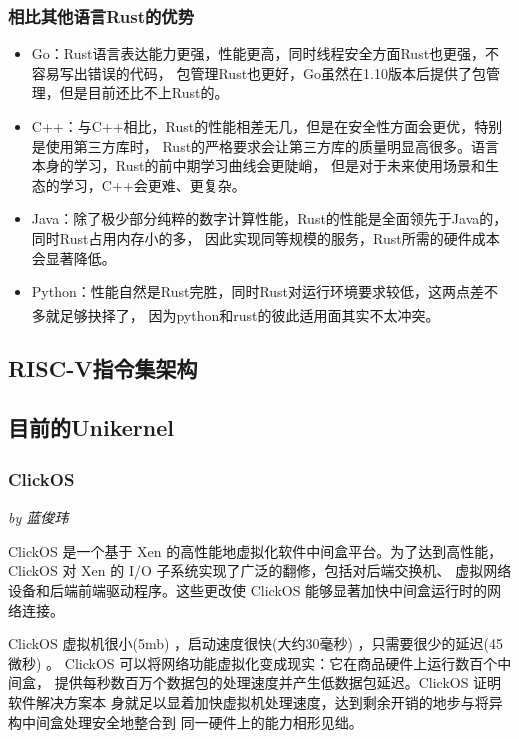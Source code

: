 \documentclass[UTF8,fontset=none,linespread=1.15]{ctexart}
\let\nosupcite\cite
\renewcommand*{\cite}[1]{\textsuperscript{\nosupcite{#1}}}
\newcommand{\sectionauthor}[1]{%
\vspace*{-5ex}
\noindent\textrm{\hfill\textit{by #1}}
\vspace*{3ex}\par}
\begin{document}
\subsubsection{相比其他语言Rust的优势}

\begin{itemize}
\item Go：Rust语言表达能力更强，性能更高，同时线程安全方面Rust也更强，不容易写出错误的代码，
包管理Rust也更好，Go虽然在1.10版本后提供了包管理，但是目前还比不上Rust的。
\item C++：与C++相比，Rust的性能相差无几，但是在安全性方面会更优，特别是使用第三方库时，
Rust的严格要求会让第三方库的质量明显高很多。语言本身的学习，Rust的前中期学习曲线会更陡峭，
但是对于未来使用场景和生态的学习，C++会更难、更复杂。
\item Java：除了极少部分纯粹的数字计算性能，Rust的性能是全面领先于Java的，同时Rust占用内存小的多，
因此实现同等规模的服务，Rust所需的硬件成本会显著降低。
\item Python：性能自然是Rust完胜，同时Rust对运行环境要求较低，这两点差不多就足够抉择了，
因为python和rust的彼此适用面其实不太冲突。\cite{bib:5-why-rust2}
\end{itemize}

\subsection{RISC-V指令集架构}%

\subsection{目前的Unikernel}
\subsubsection[ClickOS]{ClickOS\cite{bib:12-clickos}\cite{bib:13-clickos2}}\sectionauthor{蓝俊玮}


ClickOS 是一个基于 Xen 的高性能地虚拟化软件中间盒平台。为了达到高性能，
ClickOS 对 Xen 的 I/O 子系统实现了广泛的翻修，包括对后端交换机、
虚拟网络设备和后端前端驱动程序。这些更改使 ClickOS 能够显著加快中间盒运行时的网络连接。

ClickOS 虚拟机很小(5mb) ，启动速度很快(大约30毫秒) ，只需要很少的延迟(45微秒) 。
ClickOS 可以将网络功能虚拟化变成现实：它在商品硬件上运行数百个中间盒，
提供每秒数百万个数据包的处理速度并产生低数据包延迟。ClickOS 证明软件解决方案本
身就足以显着加快虚拟机处理速度，达到剩余开销的地步与将异构中间盒处理安全地整合到
同一硬件上的能力相形见绌。
\end{document}
